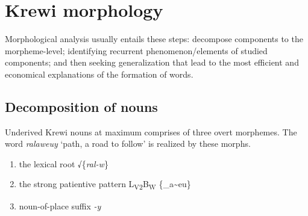 \section{Krewi morphology}%

Morphological analysis usually entails these steps: decompose components to the morpheme-level; identifying recurrent phenomenon/elements of studied components; and then seeking generalization that lead to the most efficient and economical explanations of the formation of words.

\subsection{Decomposition of nouns}%
Underived Krewi nouns at maximum comprises of three overt morphemes. The word \emph{ralaweuy} `path, a road to follow' is realized by these morphs.

\begin{enumerate}
	\item the lexical root √\{\emph{ral-w}\}
	\item the strong patientive pattern L\textsubscript{V2}B\textsubscript{W} \{\_a\~{}eu\}
	\item noun-of-place suffix \emph{-y}
\end{enumerate}
